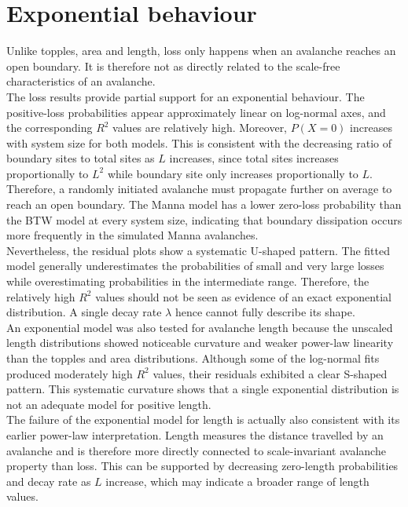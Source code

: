 \section{Exponential behaviour}\label{sec:discuss-exp}

Unlike topples, area and length, loss only happens when an avalanche reaches an open boundary. It is therefore not as directly related to the scale-free characteristics of an avalanche. \\

The loss results provide partial support for an exponential behaviour. The positive-loss probabilities appear approximately linear on log-normal axes, and the corresponding $R^2$ values are relatively high. Moreover, $P(X=0)$ increases with system size for both models. This is consistent with the decreasing ratio of boundary sites to total sites as $L$ increases, since total sites increases proportionally to $L^2$ while boundary site only increases proportionally to $L$. Therefore, a randomly initiated avalanche must propagate further on average to reach an open boundary. The Manna model has a lower zero-loss probability than the BTW model at every system size, indicating that boundary dissipation occurs more frequently in the simulated Manna avalanches.\\

Nevertheless, the residual plots show a systematic U-shaped pattern. The fitted model generally underestimates the probabilities of small and very large losses while overestimating probabilities in the intermediate range. Therefore, the relatively high $R^2$ values should not be seen as evidence of an exact exponential distribution. A single decay rate $\lambda$ hence cannot fully describe its shape. \\

An exponential model was also tested for avalanche length because the unscaled length distributions showed noticeable curvature and weaker power-law linearity than the topples and area distributions. Although some of the log-normal fits produced moderately high $R^2$ values, their residuals exhibited a clear S-shaped pattern. This systematic curvature shows that a single exponential distribution is not an adequate model for positive length.\\

The failure of the exponential model for length is actually also consistent with its earlier power-law interpretation. Length measures the distance travelled by an avalanche and is therefore more directly connected to scale-invariant avalanche property than loss. This can be supported by decreasing zero-length probabilities and decay rate as $L$ increase, which may indicate a broader range of length values.\\

